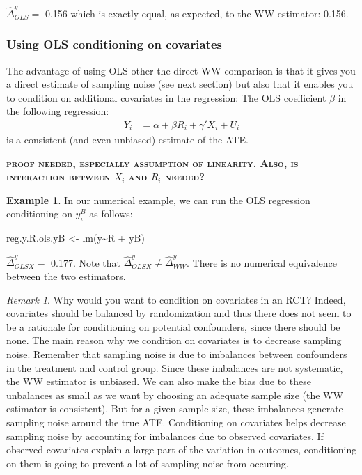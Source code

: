 \documentclass[
]{book}
\newenvironment{Shaded}{\begin{snugshade}}{\end{snugshade}}
\newcommand{\FunctionTok}[1]{\textcolor[rgb]{0.00,0.00,0.00}{#1}}
\newcommand{\NormalTok}[1]{#1}
\newcommand{\OtherTok}[1]{\textcolor[rgb]{0.56,0.35,0.01}{#1}}
\newcommand{\SpecialCharTok}[1]{\textcolor[rgb]{0.00,0.00,0.00}{#1}}
\theoremstyle{definition}
\theoremstyle{definition}
\newtheorem{example}{Example}[chapter]
\theoremstyle{definition}
\theoremstyle{definition}
\theoremstyle{remark}
\newtheorem*{remark}{Remark}
\begin{document}
\(\hat{\Delta}^y_{OLS}=\) 0.156 which is exactly equal, as expected, to the WW estimator: 0.156.

\hypertarget{using-ols-conditioning-on-covariates}{%
\subsubsection{Using OLS conditioning on covariates}\label{using-ols-conditioning-on-covariates}}

The advantage of using OLS other the direct WW comparison is that it gives you a direct estimate of sampling noise (see next section) but also that it enables you to condition on additional covariates in the regression:
The OLS coefficient \(\beta\) in the following regression:
\begin{align*}
    Y_i &  = \alpha +  \beta R_i + \gamma' X_i + U_i
    \end{align*}
is a consistent (and even unbiased) estimate of the ATE.

\textbf{\textsc{proof needed, especially assumption of linearity. Also, is interaction between \(X_i\) and \(R_i\) needed?}}

\begin{example}
\protect\hypertarget{exm:unnamed-chunk-72}{}{\label{exm:unnamed-chunk-72} }In our numerical example, we can run the OLS regression conditioning on \(y_i^B\) as follows:
\end{example}

\begin{Shaded}
\begin{Highlighting}[]
\NormalTok{reg.y.R.ols.yB }\OtherTok{\textless{}{-}} \FunctionTok{lm}\NormalTok{(y}\SpecialCharTok{\textasciitilde{}}\NormalTok{R }\SpecialCharTok{+}\NormalTok{ yB)}
\end{Highlighting}
\end{Shaded}

\(\hat{\Delta}^y_{OLSX}=\) 0.177.
Note that \(\hat{\Delta}^y_{OLSX}\neq\hat{\Delta}^y_{WW}\).
There is no numerical equivalence between the two estimators.

\begin{remark}
\iffalse{} {Remark. } \fi{}Why would you want to condition on covariates in an RCT?
Indeed, covariates should be balanced by randomization and thus there does not seem to be a rationale for conditioning on potential confounders, since there should be none.
The main reason why we condition on covariates is to decrease sampling noise.
Remember that sampling noise is due to imbalances between confounders in the treatment and control group.
Since these imbalances are not systematic, the WW estimator is unbiased.
We can also make the bias due to these unbalances as small as we want by choosing an adequate sample size (the WW estimator is consistent).
But for a given sample size, these imbalances generate sampling noise around the true ATE.
Conditioning on covariates helps decrease sampling noise by accounting for imbalances due to observed covariates.
If observed covariates explain a large part of the variation in outcomes, conditioning on them is going to prevent a lot of sampling noise from occuring.
\end{remark}
\end{document}
